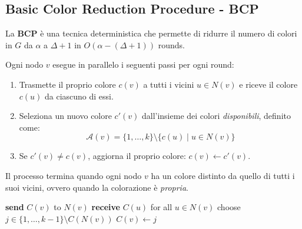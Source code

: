 \subsection{Basic Color Reduction Procedure - BCP}

La \textbf{BCP} è una tecnica deterministica che permette di ridurre il numero di colori in $G$ da $\alpha$ a $\Delta + 1$ in $O(\alpha - (\Delta + 1))$ rounds. 

Ogni nodo $v$ esegue in parallelo i seguenti passi per ogni round:

\begin{enumerate}
    \item Trasmette il proprio colore $c(v)$ a tutti i vicini $u \in N(v)$ e riceve il colore $c(u)$ da ciascuno di essi.
    \item Seleziona un nuovo colore $c'(v)$ dall'insieme dei colori \emph{disponibili}, definito come:
    \[
        \mathcal{A}(v) = \{1, \dots, k\} \setminus \{c(u) \mid u \in N(v)\}
    \]
    \item Se $c'(v) \neq c(v)$, aggiorna il proprio colore: $c(v) \leftarrow c'(v)$.
\end{enumerate}

Il processo termina quando ogni nodo $v$ ha un colore distinto da quello di tutti i suoi vicini, ovvero quando la colorazione è \emph{propria}.

\begin{algorithm}
\caption{BCP}
\begin{algorithmic}[1]
        \State \textbf{send} $C(v)$ to $N(v)$
        \State \textbf{receive} $C(u)$ for all $u \in N(v)$
            \State choose $j \in \{1, \dots, k-1\} \setminus C(N(v))$
            \State $C(v) \leftarrow j$
        \EndIf
    \EndFor
\EndFor
\end{algorithmic}
\end{algorithm}

